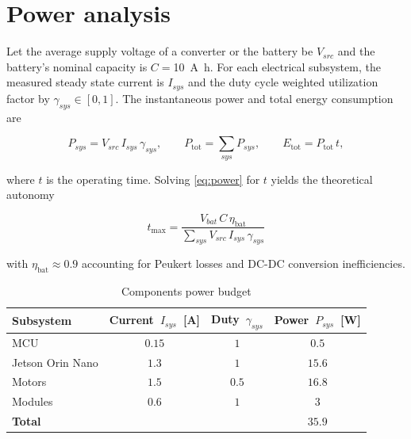 \section{Power analysis}
\label{sec:power_analysis}

Let the average supply voltage of a converter or the battery be \(V_{src}\) and the battery's nominal capacity is $C=$\SI{10}{\ampere\hour}.
For each electrical subsystem, the measured steady state current is \(I_{sys}\) and the duty cycle weighted utilization factor by \(\gamma_{sys}\in[0,1]\).
The instantaneous power and total energy consumption are

\begin{equation}
  P_{sys} = V_{src}\,I_{sys}\,\gamma_{sys},
  \qquad
  P_{\mathrm{tot}} = \sum_{sys} P_{sys},
  \qquad
  E_{\mathrm{tot}} = P_{\mathrm{tot}}\,t,
  \label{eq:power}
\end{equation}

where \(t\) is the operating time.
Solving \eqref{eq:power} for \(t\) yields the theoretical autonomy

\begin{equation}
  t_{\max} = \frac{V_{bat}\,C\,\eta_\mathrm{bat}}{\sum_{sys} V_{src}\,I_{sys}\,\gamma_{sys}}
  \label{eq:runtime}
\end{equation}

with \(\eta_\mathrm{bat}\approx0.9\) accounting for Peukert losses and DC-DC conversion inefficiencies.

\begin{table}[H]
  \centering
  \label{tab:power_budget}
  \begin{tabular}{l c c c}
    \toprule
    \textbf{Subsystem}
     & \textbf{Current}~$I_{sys}$~[A]
     & \textbf{Duty}~$\gamma_{sys}$
     & \textbf{Power}~$P_{sys}$~[W]                                        \\
    \midrule
    MCU
     & $0.15$
     & $1$
     & $0.5$         \\

    Jetson Orin Nano
     & $1.3$
     & $1$
     & $15.6$   \\

    Motors
     & $1.5$
     & $0.5$
     & $16.8$\\
    Modules
     & $0.6$
     & $1$
     & $3$ \\
    \midrule
    \textbf{Total}
     & 
     & 
     & $35.9$                                                \\
    \bottomrule
  \end{tabular}
  \caption{Components power budget}
\end{table}




